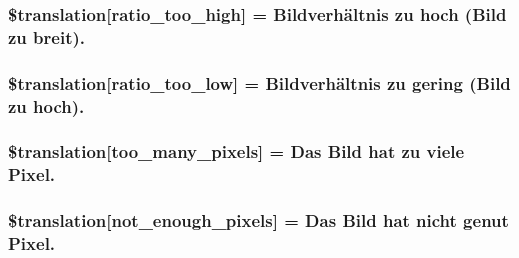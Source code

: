 \subsubsection[{\$translation}]{\setlength{\rightskip}{0pt plus 5cm}\$translation\mbox{[}\textquotesingle{}ratio\+\_\+too\+\_\+high\textquotesingle{}\mbox{]} = \textquotesingle{}Bildverhältnis zu hoch (Bild zu breit).\textquotesingle{}}\label{class_8upload_8de___d_e_8php_a23396f6ce7f31e5e5f1b57580621d982}
\hypertarget{class_8upload_8de___d_e_8php_ac533b9a479f056b0b8623e4268f068c2}{}
\subsubsection[{\$translation}]{\setlength{\rightskip}{0pt plus 5cm}\$translation\mbox{[}\textquotesingle{}ratio\+\_\+too\+\_\+low\textquotesingle{}\mbox{]} = \textquotesingle{}Bildverhältnis zu gering (Bild zu hoch).\textquotesingle{}}\label{class_8upload_8de___d_e_8php_ac533b9a479f056b0b8623e4268f068c2}
\hypertarget{class_8upload_8de___d_e_8php_aa4051ef64e94a3f8295c63cf85544016}{}
\subsubsection[{\$translation}]{\setlength{\rightskip}{0pt plus 5cm}\$translation\mbox{[}\textquotesingle{}too\+\_\+many\+\_\+pixels\textquotesingle{}\mbox{]} = \textquotesingle{}Das Bild hat zu viele Pixel.\textquotesingle{}}\label{class_8upload_8de___d_e_8php_aa4051ef64e94a3f8295c63cf85544016}
\hypertarget{class_8upload_8de___d_e_8php_a1fe342c27ce61f4ff4e0120ba647033e}{}
\subsubsection[{\$translation}]{\setlength{\rightskip}{0pt plus 5cm}\$translation\mbox{[}\textquotesingle{}not\+\_\+enough\+\_\+pixels\textquotesingle{}\mbox{]} = \textquotesingle{}Das Bild hat nicht genut Pixel.\textquotesingle{}}\label{class_8upload_8de___d_e_8php_a1fe342c27ce61f4ff4e0120ba647033e}
\hypertarget{class_8upload_8de___d_e_8php_a4ce76e7be0b3a03c2b47f6d70c21832e}{}
